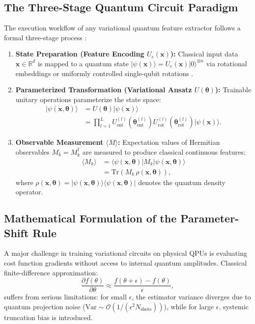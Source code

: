 \documentclass[journal]{IEEEtran}
\begin{document}
\subsection{The Three-Stage Quantum Circuit Paradigm}
The execution workflow of any variational quantum feature extractor follows a formal three-stage process \cite{schuld2021machine}:
\begin{enumerate}
    \item \textbf{State Preparation (Feature Encoding $U_e(\mathbf{x})$):} Classical input data $\mathbf{x} \in \mathbb{R}^d$ is mapped to a quantum state $|\psi(\mathbf{x})\rangle = U_e(\mathbf{x}) |0\rangle^{\otimes n}$ via rotational embeddings or uniformly controlled single-qubit rotations \cite{mottonen2004transformation}.
    \item \textbf{Parameterized Transformation (Variational Ansatz $U(\boldsymbol{\theta})$):} Trainable unitary operations parameterize the state space:
    \begin{align}
    |\psi(\mathbf{x}, \boldsymbol{\theta})\rangle &= U(\boldsymbol{\theta}) |\psi(\mathbf{x})\rangle \nonumber \\
    &= \prod_{l=1}^L U_{\mathrm{ent}}^{(l)}(\boldsymbol{\theta}_{\mathrm{ent}}^{(l)}) U_{\mathrm{rot}}^{(l)}(\boldsymbol{\theta}_{\mathrm{rot}}^{(l)}) |\psi(\mathbf{x})\rangle.
    \label{eq:ansatz_flow}
    \end{align}
    \item \textbf{Observable Measurement $\langle M \rangle$:} Expectation values of Hermitian observables $M_k = M_k^\dagger$ are measured to produce classical continuous features:
    \begin{align}
    \langle M_k \rangle &= \langle \psi(\mathbf{x}, \boldsymbol{\theta}) | M_k | \psi(\mathbf{x}, \boldsymbol{\theta}) \rangle \nonumber \\
    &= \mathrm{Tr}\left( M_k \, \rho(\mathbf{x}, \boldsymbol{\theta}) \right),
    \label{eq:measurement_def}
    \end{align}
    where $\rho(\mathbf{x}, \boldsymbol{\theta}) = |\psi(\mathbf{x}, \boldsymbol{\theta})\rangle \langle \psi(\mathbf{x}, \boldsymbol{\theta})|$ denotes the quantum density operator.
\end{enumerate}

\subsection{Mathematical Formulation of the Parameter-Shift Rule}
A major challenge in training variational circuits on physical QPUs is evaluating cost function gradients without access to internal quantum amplitudes. Classical finite-difference approximation:
\begin{equation}
\frac{\partial f(\theta)}{\partial \theta} \approx \frac{f(\theta + \epsilon) - f(\theta)}{\epsilon},
\label{eq:finite_difference}
\end{equation}
suffers from serious limitations: for small $\epsilon$, the estimator variance diverges due to quantum projection noise ($\mathrm{Var} \sim \mathcal{O}(1/(\epsilon^2 N_{\mathrm{shots}}))$), while for large $\epsilon$, systemic truncation bias is introduced.
\end{document}
